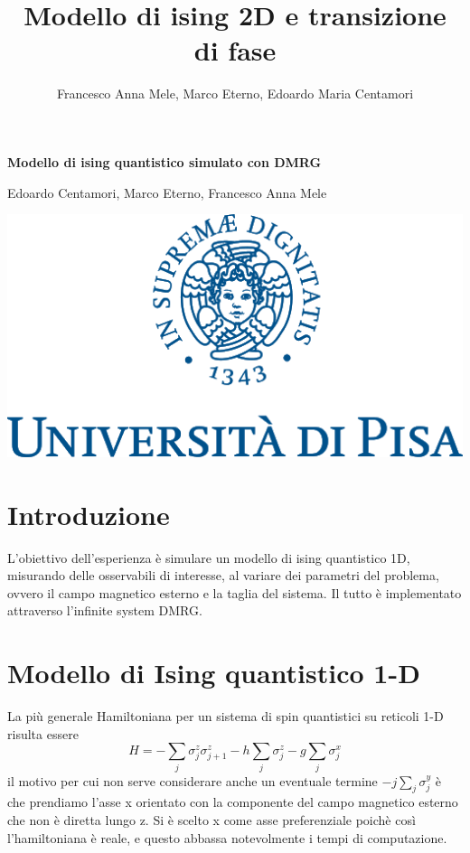 \documentclass[10pt,a4paper]{article}
\title{Modello di ising 2D e transizione di fase}
\author{Francesco Anna Mele, Marco Eterno, Edoardo Maria Centamori}
\begin{document}
	\begin{titlepage}
		\begin{center}
			
			\vspace{1cm}
			{\LARGE\textbf{ Modello di ising quantistico simulato con DMRG}\par}
			
			\vspace{0.5cm}
			{\Large Edoardo Centamori, Marco Eterno, \newline Francesco Anna Mele\par}
			
			\vspace{1cm}
			
			\includegraphics[width=0.4\linewidth]{unipi}
			
			
		\end{center}
	\tableofcontents
	\end{titlepage}
	
	\newpage
	\section{Introduzione}
	L'obiettivo dell'esperienza è simulare un modello di ising quantistico 1D, misurando delle osservabili di interesse, al variare dei parametri del problema, ovvero il campo magnetico esterno e la taglia del sistema. Il tutto è implementato  attraverso l'infinite system DMRG. 

	
	\section{Modello di Ising quantistico 1-D}
	La più generale Hamiltoniana per un sistema di spin quantistici su reticoli 1-D risulta essere
	\begin{equation}
		H=-\sum_{j} \sigma_j^z\sigma_{j+1}^z-h\sum_{j}\sigma_j^z-g\sum_{j}\sigma_j^x
		\label{hamiltonian}
	\end{equation}
	il motivo per cui non serve considerare anche un eventuale termine $-j\sum_{j}\sigma_j^y$ è che prendiamo l'asse x orientato con la componente del campo magnetico esterno che non è diretta lungo z. Si è scelto x come asse preferenziale poichè così l'hamiltoniana è reale, e questo abbassa notevolmente i tempi di computazione. 
	

	
	
	
	
	
	
	
\end{document}
